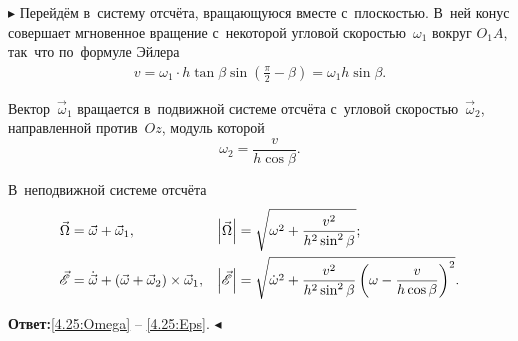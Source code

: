 \documentclass{weekly}
\begin{document}
$\blacktriangleright$ Перейдём в~систему отсчёта, вращающуюся
вместе с~плоскостью. В~ней конус совершает мгновенное вращение
с~некоторой угловой скоростью~$\omega_1$ вокруг $O_1A$,
так~что по~формуле Эйлера
\begin{align}
    v = \omega_1 \cdot h \tan\beta
            \sin\left(\frac{\pi}{2} - \beta\right)
        = \omega_1 h \sin\beta.
\end{align}

Вектор~$\vec\omega_1$ вращается в~подвижной системе отсчёта
с~угловой скоростью~$\vec\omega_2$, направленной
против~$Oz$, модуль которой
\begin{equation}
    \omega_2 = \frac{v}{h\cos\beta}.
\end{equation}

В~неподвижной системе отсчёта
\begin{align}
    \vec\Omega &= \vec\omega + \vec\omega_1, &
    \left| \vec\Omega \right| &= \sqrt{\omega^2 + \frac{v^2}{h^2\sin^2\beta}};
    \label{4.25:Omega}
\\
    \vec{\mathscr{E}} &= \dot{\vec\omega} +
            \left(\vec\omega + \vec\omega_2\right) \times \vec\omega_1, &
    \left| \vec{\mathscr{E}} \right| &= \sqrt{\dot\omega^2 +
            \frac{v^2}{h^2\sin^2\beta}
            \left(\omega - \frac{v}{h\cos\beta}\right)^2}.
    \label{4.25:Eps}
\end{align}

\textbf{Ответ:}\quad \eqref{4.25:Omega} -- \eqref{4.25:Eps}.
\hfill $\blacktriangleleft$
\end{document}
